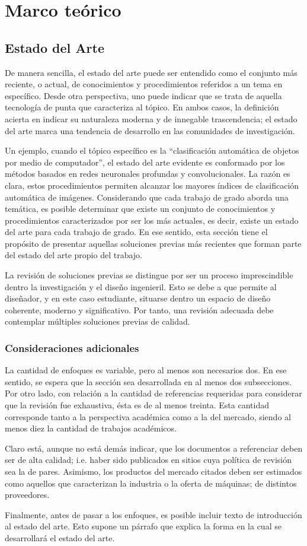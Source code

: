 \chapter{Marco teórico}
\label{sec:teoria}
\section{Estado del Arte }
De manera sencilla, el estado del arte puede ser entendido como el conjunto más reciente, o actual, de conocimientos y procedimientos referidos a un tema en específico. Desde otra perspectiva, uno puede indicar que se trata de aquella tecnología de punta que caracteriza al tópico. En ambos casos, la definición acierta en indicar su naturaleza moderna y de innegable trascendencia; el estado del arte marca una tendencia de desarrollo en las comunidades de investigación. 

Un ejemplo, cuando el tópico específico es la “clasificación automática de objetos por medio de computador”, el estado del arte evidente es conformado por los métodos basados en redes neuronales profundas y convolucionales. La razón es clara, estos procedimientos permiten alcanzar los mayores índices de clasificación automática de imágenes. 
Considerando que cada trabajo de grado aborda una temática, es posible determinar que existe un conjunto de conocimientos y procedimientos caracterizados por ser los más actuales, es decir, existe un estado del arte para cada trabajo de grado. En ese sentido, esta sección tiene el propósito de presentar aquellas soluciones previas más recientes que forman parte del estado del arte propio del trabajo. 

La revisión de soluciones previas se distingue por ser un proceso imprescindible dentro la investigación y el diseño ingenieril. Esto se debe a que permite al diseñador, y en este caso estudiante, situarse dentro un espacio de diseño coherente, moderno y significativo. Por tanto, una revisión adecuada debe contemplar múltiples soluciones previas de calidad. 

\subsection{Consideraciones adicionales}
La cantidad de enfoques es variable, pero al menos son necesarios dos. En ese sentido, se espera que la sección sea desarrollada en al menos dos subsecciones. Por otro lado, con relación a la cantidad de referencias requeridas para considerar que la revisión fue exhaustiva, ésta es de al menos treinta. Esta cantidad corresponde tanto a la perspectiva académica como a la del mercado, siendo al menos diez la cantidad de trabajos académicos.

Claro está, aunque no está demás indicar, que los documentos a referenciar deben ser de alta calidad; i.e. haber sido publicados en sitios cuya política de revisión sea la de pares. Asimismo, los productos del mercado citados deben ser estimados como aquellos que caracterizan la industria o la oferta de máquinas; de distintos proveedores. 
 
Finalmente, antes de pasar a los enfoques, es posible incluir texto de introducción al estado del arte. Esto supone un párrafo que explica la forma en la cual se desarrollará el estado del arte.
